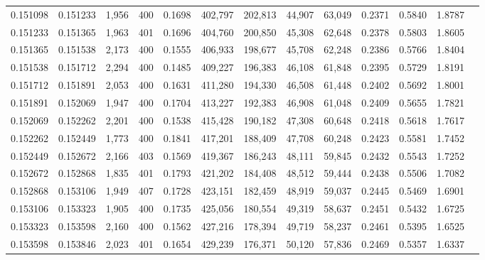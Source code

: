 \begin{tabular}{rrrrrrrrrrrrr}
0.151098 & 0.151233 & 1,956 & 400 &                                     0.1698 & 402,797 & 202,813 &  44,907 &  63,049 & 0.2371 & 0.5840 & 1.8787 \\
0.151233 & 0.151365 & 1,963 & 401 &                                     0.1696 & 404,760 & 200,850 &  45,308 &  62,648 & 0.2378 & 0.5803 & 1.8605 \\
0.151365 & 0.151538 & 2,173 & 400 &                                     0.1555 & 406,933 & 198,677 &  45,708 &  62,248 & 0.2386 & 0.5766 & 1.8404 \\
0.151538 & 0.151712 & 2,294 & 400 &                                     0.1485 & 409,227 & 196,383 &  46,108 &  61,848 & 0.2395 & 0.5729 & 1.8191 \\
0.151712 & 0.151891 & 2,053 & 400 &                                     0.1631 & 411,280 & 194,330 &  46,508 &  61,448 & 0.2402 & 0.5692 & 1.8001 \\
0.151891 & 0.152069 & 1,947 & 400 &                                     0.1704 & 413,227 & 192,383 &  46,908 &  61,048 & 0.2409 & 0.5655 & 1.7821 \\
0.152069 & 0.152262 & 2,201 & 400 &                                     0.1538 & 415,428 & 190,182 &  47,308 &  60,648 & 0.2418 & 0.5618 & 1.7617 \\
0.152262 & 0.152449 & 1,773 & 400 &                                     0.1841 & 417,201 & 188,409 &  47,708 &  60,248 & 0.2423 & 0.5581 & 1.7452 \\
0.152449 & 0.152672 & 2,166 & 403 &                                     0.1569 & 419,367 & 186,243 &  48,111 &  59,845 & 0.2432 & 0.5543 & 1.7252 \\
0.152672 & 0.152868 & 1,835 & 401 &                                     0.1793 & 421,202 & 184,408 &  48,512 &  59,444 & 0.2438 & 0.5506 & 1.7082 \\
0.152868 & 0.153106 & 1,949 & 407 &                                     0.1728 & 423,151 & 182,459 &  48,919 &  59,037 & 0.2445 & 0.5469 & 1.6901 \\
0.153106 & 0.153323 & 1,905 & 400 &                                     0.1735 & 425,056 & 180,554 &  49,319 &  58,637 & 0.2451 & 0.5432 & 1.6725 \\
0.153323 & 0.153598 & 2,160 & 400 &                                     0.1562 & 427,216 & 178,394 &  49,719 &  58,237 & 0.2461 & 0.5395 & 1.6525 \\
0.153598 & 0.153846 & 2,023 & 401 &                                     0.1654 & 429,239 & 176,371 &  50,120 &  57,836 & 0.2469 & 0.5357 & 1.6337 \\

\end{tabular}
